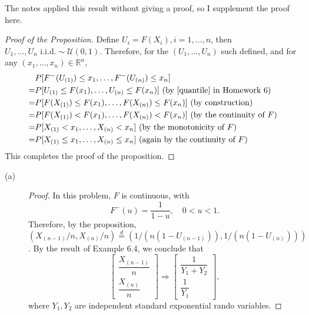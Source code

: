 \documentclass{article}
\newcommand{\real}{\mathbb{R}}
\theoremstyle{definition}
\theoremstyle{plain}
\theoremstyle{remark}
\begin{document}
\begin{description}
The notes applied this result without giving a proof, so I supplement the proof
here.
\begin{proof}[Proof of the Proposition]
Define $U_i = F(X_i), i = 1, \ldots, n$, then $U_1, \ldots, U_n \text{ i.i.d.} 
\sim \mathcal{U}(0, 1)$. Therefore, for the $(U_1, \ldots, U_n)$ such defined,
and for any $(x_1, \ldots, x_n) \in \real^n$,
\begin{align*}
   & P[F^{-}(U_{(1)}) \leq x_1, \ldots, F^{-}(U_{(n)}) \leq x_n] \\
 = & P[U_{(1)} \leq F(x_1), \ldots, U_{(n)} \leq F(x_n)] 
 \text{ (by \eqref{quantile} in Homework 6)} \\
 = & P[F(X_{(1)}) \leq F(x_1), \ldots, F(X_{(n)}) \leq F(x_n)] 
 \text{ (by construction)} \\
 = & P[F(X_{(1)}) < F(x_1), \ldots, F(X_{(n)}) < F(x_n)] 
 \text{ (by the continuity of $F$)} \\
 = & P[X_{(1)} < x_1, \ldots, X_{(n)} < x_n] 
 \text{ (by the monotonicity of $F$)} \\
 = & P[X_{(1)} \leq x_1, \ldots, X_{(n)} \leq x_n] 
 \text{ (again by the continuity of $F$)}
\end{align*}
This completes the proof of the proposition. 
\end{proof}

\begin{description}
\item[(a)]
\begin{proof}
In this problem, $F$ is continuous, with 
\begin{equation*}
    F^{-}(u) = \frac{1}{1 - u}, \quad 0 < u < 1.
\end{equation*}
Therefore, by the proposition, $(X_{(n - 1)}/n, X_{(n)}/n) \overset{d}= 
(1/(n(1 - U_{(n - 1)})), 1/(n(1 - U_{(n)})))$. By the result of Example 6.4,
we conclude that
\begin{equation*}
    \begin{bmatrix}
    \dfrac{X_{(n - 1)}}{n} \\
    \dfrac{X_{(n)}}{n}
    \end{bmatrix} 
    \Rightarrow 
    \begin{bmatrix}
    \dfrac{1}{Y_1 + Y_2} \\
    \dfrac{1}{Y_1} 
    \end{bmatrix},
\end{equation*}
where $Y_1, Y_2$ are independent standard exponential rando variables. 
\end{proof}


\end{description}
\end{description}
\end{document}
